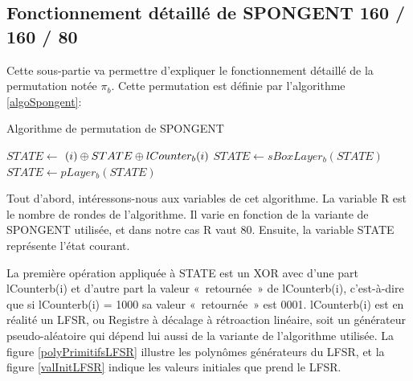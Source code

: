 		\subsection{Fonctionnement détaillé de SPONGENT 160 / 160 / 80}

				Cette sous-partie va permettre d’expliquer le fonctionnement détaillé de la
			permutation notée $\pi_{b}$. Cette permutation est définie par l’algorithme
			\ref{algoSpongent}:

			\begin{algorithm}
				\caption{Algorithme de permutation de SPONGENT}
				\label{algoSpongent}
				\begin{algorithmic}
						\STATE $ STATE \leftarrow $ $(i) \mathbin{\oplus} STATE \mathbin{\oplus} lCounter_{b}(i)$
						\STATE $ STATE \leftarrow sBoxLayer_{b}(STATE)$
						\STATE $ STATE \leftarrow pLayer_{b}(STATE)$
					\ENDFOR
				\end{algorithmic}
			\end{algorithm}

				Tout d’abord, intéressons-nous aux variables de cet algorithme. La
			variable R est le nombre de rondes de l’algorithme. Il varie en fonction
			de la variante de SPONGENT utilisée, et dans notre cas R vaut 80. Ensuite,
			la variable STATE représente l’état courant.

				La première opération appliquée à STATE est un XOR avec d’une part
			lCounterb(i) et d’autre part la valeur « retournée » de lCounterb(i),
			c’est-à-dire que si lCounterb(i) = 1000 sa valeur « retournée » est 0001.
			lCounterb(i) est en réalité un LFSR, ou Registre à décalage à rétroaction
			linéaire, soit un générateur pseudo-aléatoire qui dépend lui aussi de la
			variante de l’algorithme utilisée. La figure \ref{polyPrimitifsLFSR}
			illustre les polynômes générateurs du LFSR, et la figure \ref{valInitLFSR}
			indique les valeurs initiales que prend le LFSR.


